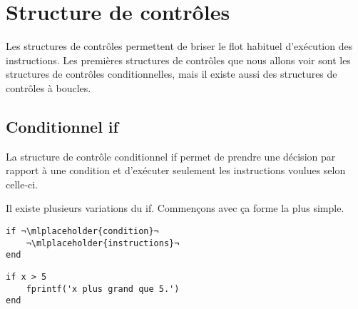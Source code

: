 \documentclass{tufte-handout}
\begin{document}
\section{Structure de contrôles}
Les structures de contrôles permettent de briser le flot habituel d'exécution des instructions. Les premières structures de contrôles que nous allons voir sont les structures de contrôles conditionnelles, mais il existe aussi des structures de contrôles à boucles.
\subsection{Conditionnel if}
La structure de contrôle conditionnel if permet de prendre une décision par rapport à une condition et d'exécuter seulement les instructions voulues selon celle-ci.

Il existe plusieurs variations du if. Commençons avec ça forme la plus simple.

\begin{fullwidth}
    \begin{minipage}{.45\linewidth}
    \begin{lstlisting}[title={Structure du if simple}]
if ¬\mlplaceholder{condition}¬
    ¬\mlplaceholder{instructions}¬
end
    \end{lstlisting}
    \end{minipage}\hfill
    \begin{minipage}{.45\linewidth}
    \begin{lstlisting}[title={Exemple du if simple}]
if x > 5
    fprintf('x plus grand que 5.')
end
    \end{lstlisting}
    \end{minipage}
\end{fullwidth}
\end{document}
